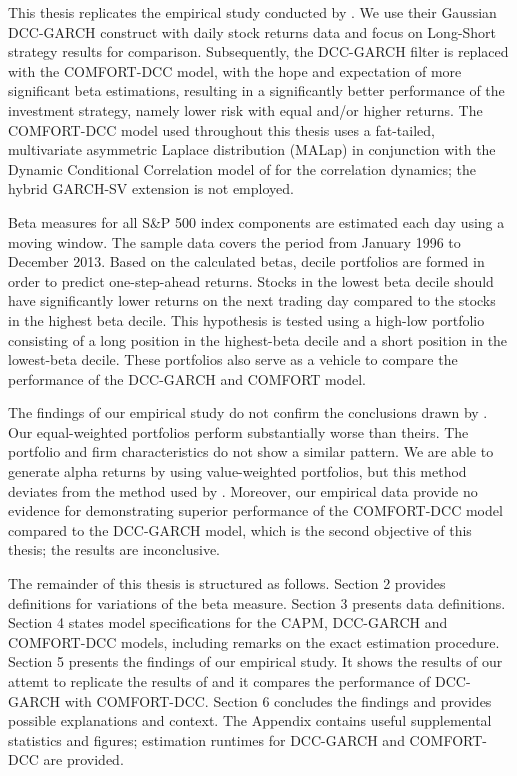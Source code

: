\documentclass[11pt,a4paper]{article}
\def \indexName {S\&P 500}
\def \periodFrom {January 1996}
\def \periodTo {December 2013}
\begin{document}
This thesis replicates the empirical study conducted by . We use their Gaussian DCC-GARCH construct with daily stock returns data and focus on Long-Short strategy results for comparison. Subsequently, the DCC-GARCH filter is replaced with the COMFORT-DCC model, with the hope and expectation of more significant beta estimations, resulting in a significantly better performance of the investment strategy, namely lower risk with equal and/or higher returns. The COMFORT-DCC model used throughout this thesis uses a fat-tailed, multivariate asymmetric Laplace distribution (MALap) in conjunction with the Dynamic Conditional Correlation model of  for the correlation dynamics; the hybrid GARCH-SV extension is not employed.

Beta measures for all \indexName{} index components are estimated each day using a moving window. The sample data covers the period from \periodFrom{} to \periodTo{}. Based on the calculated betas, decile portfolios are formed in order to predict one-step-ahead returns. Stocks in the lowest beta decile should have significantly lower returns on the next trading day compared to the stocks in the highest beta decile. This hypothesis is tested using a high-low portfolio consisting of a long position in the highest-beta decile and a short position in the lowest-beta decile. These portfolios also serve as a vehicle to compare the performance of the DCC-GARCH and COMFORT model.

The findings of our empirical study do not confirm the conclusions drawn by . Our equal-weighted portfolios perform substantially worse than theirs. The portfolio and firm characteristics do not show a similar pattern. We are able to generate alpha returns by using value-weighted portfolios, but this method deviates from the method used by . Moreover, our empirical data provide no evidence for demonstrating superior performance of the COMFORT-DCC model compared to the DCC-GARCH model, which is the second objective of this thesis; the results are inconclusive.

The remainder of this thesis is structured as follows. Section 2 provides definitions for variations of the beta measure. Section 3 presents data definitions. Section 4 states model specifications for the CAPM, DCC-GARCH and COMFORT-DCC models, including remarks on the exact estimation procedure. Section 5 presents the findings of our empirical study. It shows the results of our attemt to replicate the results of  and it compares the performance of DCC-GARCH with COMFORT-DCC. Section 6 concludes the findings and provides possible explanations and context. The Appendix contains useful supplemental statistics and figures; estimation runtimes for DCC-GARCH and COMFORT-DCC are provided.
\end{document}
